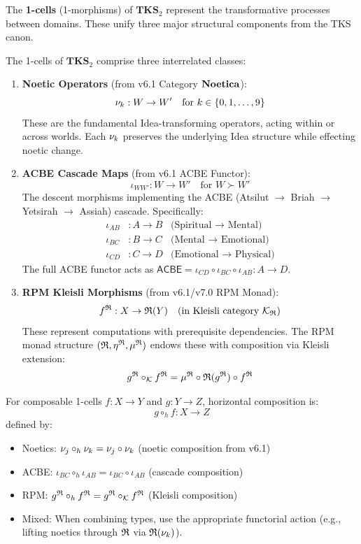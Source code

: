 The \textbf{1-cells} (1-morphisms) of $\mathbf{TKS}_2$ represent the transformative
processes between domains. These unify three major structural components from the
TKS canon.

\begin{definition}
\label{def:1-cells-tks2}
The 1-cells of $\mathbf{TKS}_2$ comprise three interrelated classes:

\begin{enumerate}[label=(\alph*)]
  \item \textbf{Noetic Operators} (from v6.1 Category $\mathbf{Noetica}$):
  \[
    \nu_{k} : W \to W' \quad \text{for } k \in \{0, 1, \ldots, 9\}
  \]
  These are the fundamental Idea-transforming operators, acting within or across worlds.
  Each $\nu_{k}$ preserves the underlying Idea structure while effecting noetic change.

  \item \textbf{ACBE Cascade Maps} (from v6.1 ACBE Functor):
  \[
    \iota_{WW'} : W \to W' \quad \text{for } W \succ W'
  \]
  The descent morphisms implementing the ACBE (Atsilut $\to$ Briah $\to$ Yetsirah $\to$ Assiah)
  cascade. Specifically:
  \begin{align*}
    \iota_{AB} &: A \to B & \text{(Spiritual $\to$ Mental)} \\
    \iota_{BC} &: B \to C & \text{(Mental $\to$ Emotional)} \\
    \iota_{CD} &: C \to D & \text{(Emotional $\to$ Physical)}
  \end{align*}
  The full ACBE functor acts as $\mathsf{ACBE} = \iota_{CD} \circ \iota_{BC} \circ \iota_{AB} : A \to D$.

  \item \textbf{RPM Kleisli Morphisms} (from v6.1/v7.0 RPM Monad):
  \[
    f^{\mathfrak{R}} : X \to \mathfrak{R}(Y) \quad \text{(in Kleisli category $\mathcal{K}_{\mathfrak{R}}$)}
  \]
  These represent computations with prerequisite dependencies. The RPM monad structure
  $(\mathfrak{R}, \eta^{\mathfrak{R}}, \mu^{\mathfrak{R}})$ endows these with composition via Kleisli extension:
  \[
    g^{\mathfrak{R}} \circ_{\mathcal{K}} f^{\mathfrak{R}} = \mu^{\mathfrak{R}} \circ \mathfrak{R}(g^{\mathfrak{R}}) \circ f^{\mathfrak{R}}
  \]
\end{enumerate}
\end{definition}

\begin{definition}
\label{def:1-cell-horizontal-comp}
For composable 1-cells $f : X \to Y$ and $g : Y \to Z$, horizontal composition is:
\[
g \circ_h f : X \to Z
\]
defined by:
\begin{itemize}
  \item Noetics: $\nu_{j} \circ_h \nu_{k} = \nu_{j} \circ \nu_{k}$ (noetic composition from v6.1)
  \item ACBE: $\iota_{BC} \circ_h \iota_{AB} = \iota_{BC} \circ \iota_{AB}$ (cascade composition)
  \item RPM: $g^{\mathfrak{R}} \circ_h f^{\mathfrak{R}} = g^{\mathfrak{R}} \circ_{\mathcal{K}} f^{\mathfrak{R}}$ (Kleisli composition)
  \item Mixed: When combining types, use the appropriate functorial action (e.g., lifting
        noetics through $\mathfrak{R}$ via $\mathfrak{R}(\nu_{k})$).
\end{itemize}
\end{definition}

